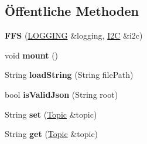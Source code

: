 \subsection*{Öffentliche Methoden}
\begin{DoxyCompactItemize}
\item 
\mbox{\label{class_f_f_s_abe1095a504fbac291132b6e953fafa77}} 
{\bfseries F\+FS} (\hyperlink{class_l_o_g_g_i_n_g}{L\+O\+G\+G\+I\+NG} \&logging, \hyperlink{class_i2_c}{I2C} \&i2c)
\item 
\mbox{\label{class_f_f_s_a4f3cd84efbb1cfb7e32782d11cedf803}} 
void {\bfseries mount} ()
\item 
\mbox{\label{class_f_f_s_afb78519dca9d5f550b6f786de3dc1eac}} 
String {\bfseries load\+String} (String file\+Path)
\item 
\mbox{\label{class_f_f_s_a26e3c3d788b8b225ce2095d1e7d3bf44}} 
bool {\bfseries is\+Valid\+Json} (String root)
\item 
\mbox{\label{class_f_f_s_a8fd9e800d2ca5643201d65338bf28b3d}} 
String {\bfseries set} (\hyperlink{class_topic}{Topic} \&topic)
\item 
\mbox{\label{class_f_f_s_a10ffd43fbbff003425dcbb76546b3518}} 
String {\bfseries get} (\hyperlink{class_topic}{Topic} \&topic)
\end{DoxyCompactItemize}
